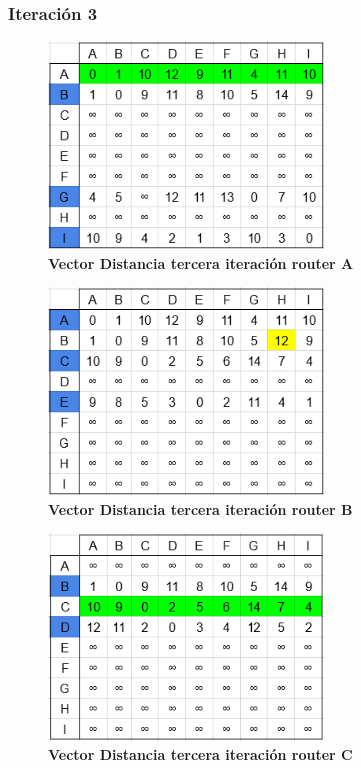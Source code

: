 \documentclass[12pt]{article}
\begin{document}
\subsubsection{Iteración 3}

\begin{figure}[H] 
\centering 
\includegraphics[width=0.65\textwidth]{imagenes/2A3.png} \caption{\small \textbf{Vector Distancia tercera iteración router A}}
\label{fig:diagrama_35} 
\end{figure}
\begin{figure}[H] 
\centering 
\includegraphics[width=0.65\textwidth]{imagenes/2B3.png} \caption{\small \textbf{Vector Distancia tercera iteración router B}}
\label{fig:diagrama_36} 
\end{figure}
\begin{figure}[H] 
\centering 
\includegraphics[width=0.65\textwidth]{imagenes/2C3.png} \caption{\small \textbf{Vector Distancia tercera iteración router C}}
\label{fig:diagrama_37} 
\end{figure}
\end{document}
